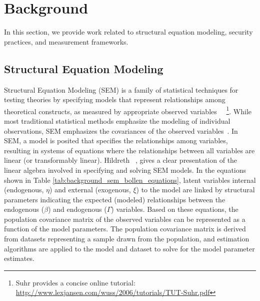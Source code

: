 \section{Background}
\label{sec:background}
In this section, we provide work related to structural equation modeling, security practices, and measurement frameworks.

\subsection{Structural Equation Modeling}

Structural Equation Modeling (SEM) is a family of statistical techniques for testing theories by specifying models that represent relationships among theoretical constructs, as measured by appropriate observed variables~\cite{kline2015principles} ~\footnote{Suhr provides a concise online tutorial: \url{http://www.lexjansen.com/wuss/2006/tutorials/TUT-Suhr.pdf}}. While most traditional statistical methods emphasize the modeling of individual observations, SEM emphasizes the covariances of the observed variables~\cite{hildreth2013residual}. In SEM, a model is posited that specifies the relationships among variables, resulting in systems of equations where the relationships between all variables are linear (or transformably linear). Hildreth ~\cite{hildreth2013residual}, gives a clear presentation of the linear algebra involved in specifying and solving SEM models. In the equations shown in Table \ref{tab:background_sem_bollen_equations}, latent variables internal (endogenous, $\eta$) and external (exogenous, $\xi$) to the model are linked by structural parameters indicating the expected (modeled) relationships between the endogenous ($\beta$) and endogenous ($\Gamma$) variables. Based on these equations, the population covariance matrix of the observed variables can be represented as a function of the model parameters. The population covariance matrix is derived from datasets representing a sample drawn from the population, and estimation algorithms are applied to the model and dataset to solve for the model parameter estimates. 
